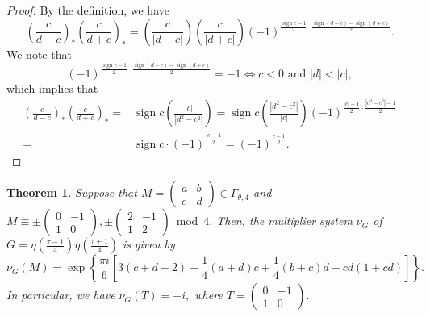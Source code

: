 \documentclass[12pt]{article}
\theoremstyle{definition}
\newtheorem{theorem}{Theorem}
\numberwithin{equation}{section}
\numberwithin{theorem}{section}
\newcommand{\sign}{\operatorname{sign}}
\begin{document}
\begin{proof}
By the definition, 
we have 
\begin{equation*}
\left(
\frac{c}{d-c}
\right)_{*}
\left(
\frac{c}{d+c}
\right)_{*}
=
\left(
\frac{c}{ |d-c| }
\right)
\left(
\frac{c}{ |d+c| }
\right)
(-1)^{
\frac{\sign c -1}{2}
\cdot
\frac{\sign (d-c) -\sign(d+c)}{2}
}. 
\end{equation*}
We note that 
\begin{equation*}
(-1)^{
\frac{\sign c -1}{2}
\cdot
\frac{\sign (d-c) -\sign(d+c)}{2}
} 
=
-1
\Longleftrightarrow 
c<0 \,\, 
 \mathrm{and} 
 \,\, 
 |d|<|c|,
\end{equation*}
which implies that 
\begin{align*}
\left(
\frac{c}{d-c}
\right)_{*}
\left(
\frac{c}{d+c}
\right)_{*}
=&
\sign c
\left(
\frac{ |c| }{|d^2-c^2|}
\right)
=
\sign c
\left(
\frac {|d^2-c^2|}{ |c| }
\right)
(-1)^
{
\frac{ |c|-1}{2}
\cdot
\frac{ |d^2-c^2|-1  }{2}
}  \\
=&
\sign c 
\cdot
(-1)^{
\frac{|c|-1}{2}
}
=
(-1)^{
\frac{c-1}{2}
}. 
\end{align*}
\end{proof}









\begin{theorem}
\label{thm:M:c-odd-level4}
{\it
Suppose that 
$
M=
\begin{pmatrix}
a & b \\
c & d
\end{pmatrix}
\in 
\Gamma_{\theta,4}
$ 
and 
$M\equiv 
\pm
\begin{pmatrix}
0 & -1 \\
1 & 0
\end{pmatrix}, 
 \pm
\begin{pmatrix}
2 & -1 \\
1 & 2
\end{pmatrix}
\bmod{4}. 
$ 
Then, 
the multiplier system 
$\nu_{G}$ of 
$
\displaystyle 
G=
\eta \left(\frac{\tau-1}{4} \right) \eta\left(\frac{\tau+1}{4} \right)
$ 
is given by 
\begin{equation*}
\nu_{G}
(M)
=
\exp
\left\{
\frac{\pi i}{6}
\left[
3(c+d-2)+\frac14(a+d)c
+
\frac14(b+c)d-cd(1+cd)
\right]
\right\}. 
\end{equation*}
In particular, we have $\nu_{G}(T)=-i,$ where 
$
T=
\begin{pmatrix}
0 & -1 \\
1 & 0
\end{pmatrix}.  
$
}
\end{theorem}
\end{document}
